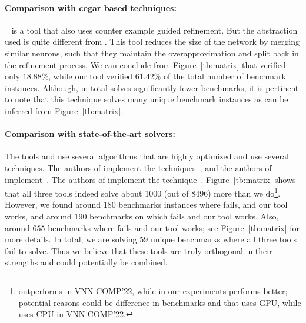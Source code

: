 \paragraph{Comparison with cegar based techniques: }
\cegarnn{}~\cite{elboher2020abstraction} is a tool that also uses  counter example guided refinement. But the abstraction used is quite different from \deeppoly{}. This tool reduces the size of the network by merging similar neurons, such that they maintain the overapproximation and split back in the refinement process. We can conclude from Figure~\ref{tb:matrix} that \cegarnn{} verified only  $18.88\%$, while our tool verified $61.42\%$ of the total number of benchmark instances. Although, in total \cegarnn{} solves significantly fewer benchmarks, it is pertinent to note that this technique solves many unique benchmark instances as can be inferred from Figure~\ref{tb:matrix}. %


\paragraph{Comparison with state-of-the-art solvers: }
The tools \alphabeta{} and \ovaltool{} use several algorithms that are highly optimized and use several techniques. 
The authors of \alphabeta{} implement the techniques~\cite{zhang2018efficient,wang2021beta,xu2020fast,zhang2022branch,tjeng2017evaluating}, 
and the authors of \ovaltool{} implement~\cite{bunel2018unified,bunel2020branch,bunel2020lagrangian,de2021scaling,de2021scaling,de2021scaling2,de2021improved}.
The authors of \marabou{} implement the technique~\cite{katz2019marabou}. 
Figure~\ref{tb:matrix} shows that all three tools indeed solve about 1000 (out of 8496) more than 
we do\footnote{\alphabeta{} outperforms \marabou{} in VNN-COMP'22, while in our experiments \marabou{} performs better; potential reasons could be difference in benchmarks and that \alphabeta{} uses \textsc{GPU}, while \marabou{} uses \textsc{CPU} in VNN-COMP'22.}. 
However, we found around $180$ benchmarks instances where \alphabeta{} fails, and our tool works, 
and around $190$ benchmarks on which \ovaltool{} fails and our tool works. 
Also, around $655$ benchmarks where \marabou{} fails and our tool works; see Figure~\ref{tb:matrix} for more details. 
In total, we are solving $59$ unique benchmarks where all three tools fail to solve. 
Thus we believe that these tools are truly orthogonal in their strengths and could potentially be combined. 


